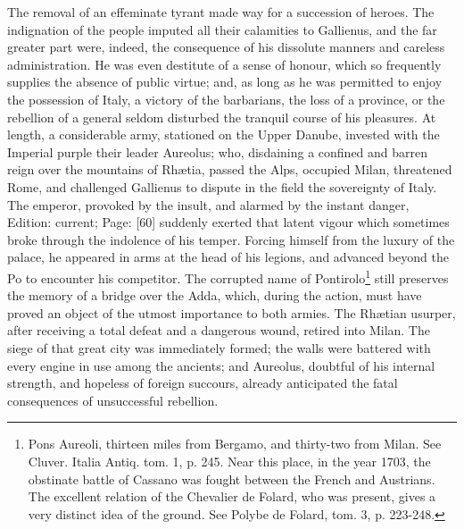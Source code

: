 The removal of an effeminate tyrant made way for a succession of heroes. The indignation of the people imputed all their calamities to Gallienus, and the far greater part were, indeed, the consequence of his dissolute manners and careless administration. He was even destitute of a sense of honour, which so frequently supplies the absence of public virtue; and, as long as he was permitted to enjoy the possession of Italy, a victory of the barbarians, the loss of a province, or the rebellion of a general seldom disturbed the tranquil course of his pleasures. At length, a considerable army, stationed on the Upper Danube, invested with the Imperial purple their leader Aureolus; who, disdaining a confined and barren reign over the mountains of Rhætia, passed the Alps, occupied Milan, threatened Rome, and challenged Gallienus to dispute in the field the sovereignty of Italy. The emperor, provoked by the insult, and alarmed by the instant danger, Edition: current; Page: [60] suddenly exerted that latent vigour which sometimes broke through the indolence of his temper. Forcing himself from the luxury of the palace, he appeared in arms at the head of his legions, and advanced beyond the Po to encounter his competitor. The corrupted name of Pontirolo\footnote{Pons Aureoli, thirteen miles from Bergamo, and thirty-two from Milan. See Cluver. Italia Antiq. tom. 1, p. 245. Near this place, in the year 1703, the obstinate battle of Cassano was fought between the French and Austrians. The excellent relation of the Chevalier de Folard, who was present, gives a very distinct idea of the ground. See Polybe de Folard, tom. 3, p. 223-248.} still preserves the memory of a bridge over the Adda, which, during the action, must have proved an object of the utmost importance to both armies. The Rhætian usurper, after receiving a total defeat and a dangerous wound, retired into Milan. The siege of that great city was immediately formed; the walls were battered with every engine in use among the ancients; and Aureolus, doubtful of his internal strength, and hopeless of foreign succours, already anticipated the fatal consequences of unsuccessful rebellion.

